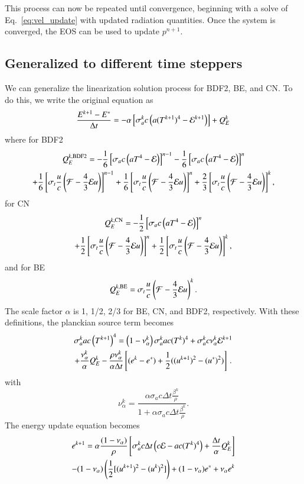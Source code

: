 This process can now be repeated until
convergence, beginning with a solve of Eq.~\eqref{eq:vel_update} with updated
radiation quantities.  Once the system is converged, the EOS can be used to
update $p^{n+1}$.

\subsection{Generalized to different time steppers}

We can generalize the linearization solution process for BDF2, BE, and CN. To do this, we
write the original equation as
\begin{align*}
   \frac{E^{k+1} - E^*}{\Delta t} &= - \alpha \left[\sigma_a^k c \left(
   a(T^{k+1})^4 - \mathcal{E}^{k+1}\right)\right]+Q_E^k \\
\end{align*}
where for BDF2
\begin{multline}
    Q^{k,\text{BDF2}}_E = -\frac{1}{6}\left[\sigma_a c\left( aT^4 - \mathcal{E}\right)\right]^{n-1}
    -\frac{1}{6}\left[\sigma_a c\left( aT^4 - \mathcal{E}\right)\right]^{n} \\
    +\frac{1}{6}\left[\sigma_t \frac{u}{c} \left( \mathcal{F} - \frac{4}{3} \mathcal{E} u \right)\right]^{n-1} + \frac{1}{6}\left[\sigma_t \frac{u}{c} \left( \mathcal{F} - \frac{4}{3} \mathcal{E} u \right)\right]^{n} + \frac{2}{3}\left[\sigma_t \frac{u}{c} \left( \mathcal{F} - \frac{4}{3} \mathcal{E} u \right)\right]^{k},
\end{multline}
for CN
\begin{multline}
    Q^{k,\text{CN}}_E = -\frac{1}{2}\left[\sigma_a c\left( aT^4 - \mathcal{E}\right)\right]^n\\
   +\frac{1}{2}\left[\sigma_t \frac{u}{c} \left( \mathcal{F} - \frac{4}{3} \mathcal{E} u \right)\right]^n + \frac{1}{2}\left[\sigma_t \frac{u}{c} \left( \mathcal{F} - \frac{4}{3} \mathcal{E} u \right)\right]^k,
\end{multline}
and for BE
\begin{equation*}
    Q^{k,\text{BE}}_E = \sigma_t \frac{u}{c} \left( \mathcal{F} - \frac{4}{3} \mathcal{E} u \right)^k.
\end{equation*}
The scale factor $\alpha$ is 1, 1/2, 2/3 for BE, CN, and BDF2, respectively. With
these definitions, the planckian source term becomes
\begin{multline}
   \sigma_a^k a c\left(T^{k+1}\right)^4 = \left(1 - \nu_{\alpha}^k\right)
   \sigma_a^k a c (T^k)^4 + \sigma_a^k c \nu_{\alpha}^k \mathcal{E}^{k+1}\\
   +\frac{\nu_{\alpha}^k}{\alpha} Q_E^k - \frac{\rho\nu_{\alpha}^k}{\alpha\Delta t}
   \left[(e^k - e^*) + \frac{1}{2}((u^{k+1})^2 - (u^*)^2)\right] \, .
\end{multline}
with 
\begin{equation}
    \nu^k_{\alpha} = \frac{\alpha\sigma_a c\Delta t \frac{\beta^k}{\rho}}{1 +
    \alpha\sigma_a c\Delta t \frac{\beta^k}{\rho}}.
\end{equation}
The energy update equation becomes
\begin{multline}
    e^{k+1} = \alpha\frac{(1-\nu_{\alpha})}{\rho}\left[\sigma_a^k c\Delta t \left(c\mathcal{E}
    - ac(T^k)^4\right) + \frac{\Delta t}{\alpha} Q_E^k \right] \\ - (1 -
    \nu_{\alpha})\left(\frac{1}{2}[(u^{k+1})^2 - (u^{k})^2]\right)
    +(1-\nu_\alpha)e^*+ \nu_{\alpha}e^k
\end{multline}

